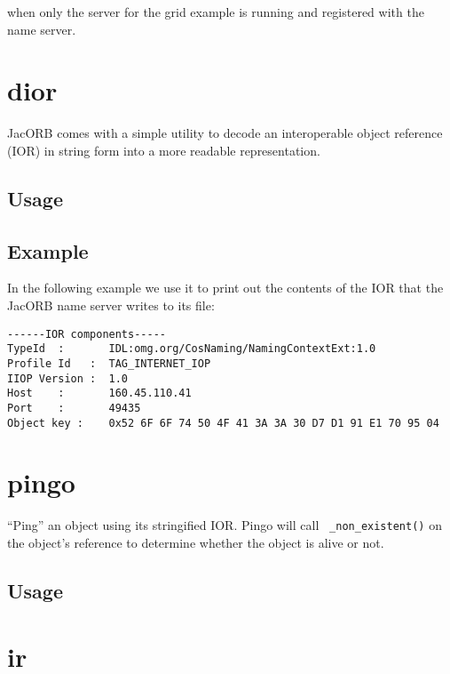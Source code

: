 when only the server for the grid example is running and registered
with the name server.


\section{dior}

JacORB comes with a simple utility to decode an interoperable object reference
(IOR) in string form into a more readable representation.

\subsection*{Usage}


\subsection*{Example}

In the following example we use it to print out the contents of the
IOR that the JacORB name server writes to its file:

\small{\begin{verbatim}
------IOR components-----
TypeId  :       IDL:omg.org/CosNaming/NamingContextExt:1.0
Profile Id   :  TAG_INTERNET_IOP
IIOP Version :  1.0
Host    :       160.45.110.41
Port    :       49435
Object key :    0x52 6F 6F 74 50 4F 41 3A 3A 30 D7 D1 91 E1 70 95 04
\end{verbatim}
}

\section{pingo}

``Ping'' an object using its stringified IOR. Pingo will call {\tt
  \_non\_existent()} on the object's reference to determine whether
  the object is alive or not.

\subsection*{Usage}


\section{ir}

